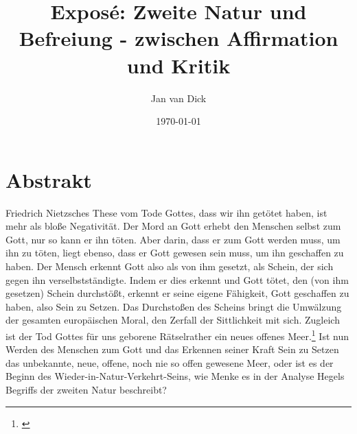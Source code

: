\documentclass[a4paper, 12pt]{article}
\title{Exposé: \glqq Zweite Natur und Befreiung - zwischen Affirmation und Kritik\grqq}
\author{Jan van Dick}
\date{\today}
\begin{document}
\maketitle

\section{Abstrakt}
Friedrich Nietzsches These vom Tode Gottes, dass \glqq wir\grqq{} ihn getötet haben, ist mehr als bloße Negativität. 
Der Mord an Gott erhebt den Menschen selbst zum Gott, nur so kann er ihn töten.
Aber darin, dass er zum Gott werden muss, um ihn zu töten, liegt ebenso, dass er Gott gewesen sein muss, um ihn geschaffen zu haben.
Der Mensch erkennt Gott also als von ihm gesetzt, als Schein, der sich gegen ihn verselbstständigte.
Indem er dies erkennt und Gott tötet, den (von ihm gesetzen) Schein durchstößt, erkennt er seine eigene Fähigkeit, Gott geschaffen zu haben, also Sein zu Setzen. 
Das Durchstoßen des Scheins bringt die Umwälzung der gesamten europäischen Moral, den Zerfall der Sittlichkeit mit sich.
Zugleich ist der Tod Gottes für uns \glqq geborene Rätselrather\grqq{} ein \glqq neues offenes Meer\grqq .\footnote{\citeauthor[Vgl.][573]{nietzsche_morgenrote_1999}}
Ist nun Werden des Menschen zum Gott und das Erkennen seiner Kraft Sein zu Setzen das unbekannte, neue, offene, noch nie so offen gewesene Meer, oder ist es der Beginn des Wieder-in-Natur-Verkehrt-Seins, wie Menke es in der Analyse Hegels Begriffs der zweiten Natur beschreibt?\\
\end{document}
